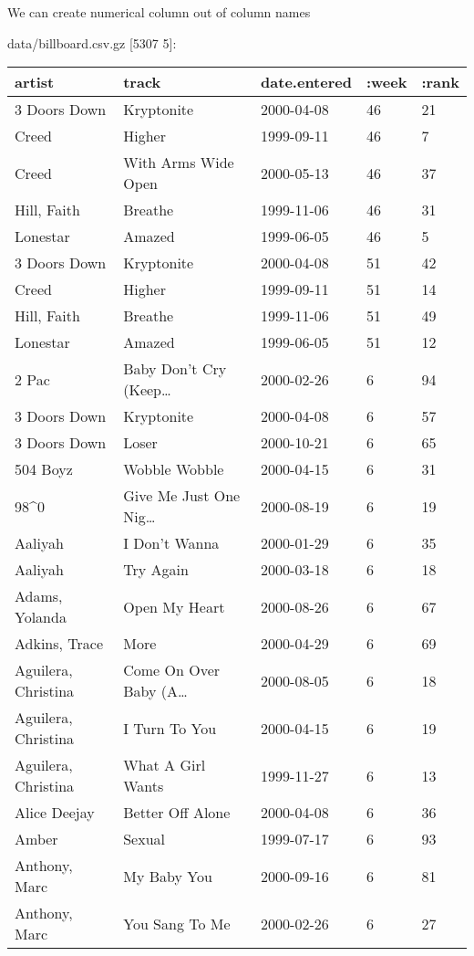\documentclass[]{article}
\newenvironment{Shaded}{\begin{snugshade}}{\end{snugshade}}
\newcommand{\AttributeTok}[1]{\textcolor[rgb]{0.77,0.63,0.00}{#1}}
\newcommand{\NormalTok}[1]{#1}
\newcommand{\SpecialStringTok}[1]{\textcolor[rgb]{0.31,0.60,0.02}{#1}}
\newcommand{\StringTok}[1]{\textcolor[rgb]{0.31,0.60,0.02}{#1}}
\newcommand{\VariableTok}[1]{\textcolor[rgb]{0.00,0.00,0.00}{#1}}
\begin{document}
We can create numerical column out of column names

\begin{Shaded}
\end{Shaded}

data/billboard.csv.gz {[}5307 5{]}:

\begin{longtable}[]{@{}lllll@{}}
\toprule
artist & track & date.entered & :week & :rank\tabularnewline
\midrule
\endhead
3 Doors Down & Kryptonite & 2000-04-08 & 46 & 21\tabularnewline
Creed & Higher & 1999-09-11 & 46 & 7\tabularnewline
Creed & With Arms Wide Open & 2000-05-13 & 46 & 37\tabularnewline
Hill, Faith & Breathe & 1999-11-06 & 46 & 31\tabularnewline
Lonestar & Amazed & 1999-06-05 & 46 & 5\tabularnewline
3 Doors Down & Kryptonite & 2000-04-08 & 51 & 42\tabularnewline
Creed & Higher & 1999-09-11 & 51 & 14\tabularnewline
Hill, Faith & Breathe & 1999-11-06 & 51 & 49\tabularnewline
Lonestar & Amazed & 1999-06-05 & 51 & 12\tabularnewline
2 Pac & Baby Don't Cry (Keep\ldots{} & 2000-02-26 & 6 &
94\tabularnewline
3 Doors Down & Kryptonite & 2000-04-08 & 6 & 57\tabularnewline
3 Doors Down & Loser & 2000-10-21 & 6 & 65\tabularnewline
504 Boyz & Wobble Wobble & 2000-04-15 & 6 & 31\tabularnewline
98\^{}0 & Give Me Just One Nig\ldots{} & 2000-08-19 & 6 &
19\tabularnewline
Aaliyah & I Don't Wanna & 2000-01-29 & 6 & 35\tabularnewline
Aaliyah & Try Again & 2000-03-18 & 6 & 18\tabularnewline
Adams, Yolanda & Open My Heart & 2000-08-26 & 6 & 67\tabularnewline
Adkins, Trace & More & 2000-04-29 & 6 & 69\tabularnewline
Aguilera, Christina & Come On Over Baby (A\ldots{} & 2000-08-05 & 6 &
18\tabularnewline
Aguilera, Christina & I Turn To You & 2000-04-15 & 6 & 19\tabularnewline
Aguilera, Christina & What A Girl Wants & 1999-11-27 & 6 &
13\tabularnewline
Alice Deejay & Better Off Alone & 2000-04-08 & 6 & 36\tabularnewline
Amber & Sexual & 1999-07-17 & 6 & 93\tabularnewline
Anthony, Marc & My Baby You & 2000-09-16 & 6 & 81\tabularnewline
Anthony, Marc & You Sang To Me & 2000-02-26 & 6 & 27\tabularnewline
\bottomrule
\end{longtable}
\end{document}
